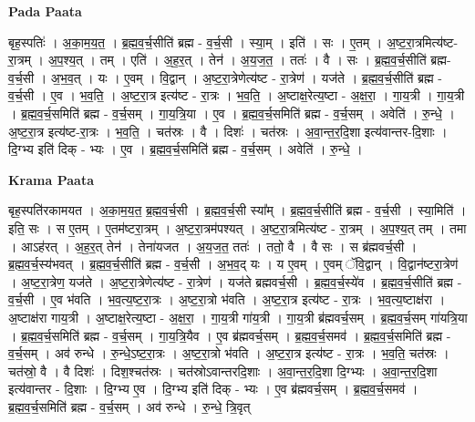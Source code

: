\documentclass[17pt]{extarticle}
\begin{document}
\textbf{Pada Paata} \newline

बृह॒स्पतिः॑ । अ॒का॒म॒य॒त॒ । ब्र॒ह्म॒व॒र्च॒सीति॑ ब्रह्म - व॒र्च॒सी । स्या॒म् । इति॑ । सः । ए॒तम् । अ॒ष्ट॒रा॒त्रमित्य॑ष्ट-रा॒त्रम् । अ॒प॒श्य॒त् । तम् । एति॑ । अ॒ह॒र॒त् । तेन॑ । अ॒य॒ज॒त॒ । ततः॑ । वै । सः । ब्र॒ह्म॒व॒र्च॒सीति॑ ब्रह्म-व॒र्च॒सी । अ॒भ॒व॒त् । यः । ए॒वम् । वि॒द्वान् । अ॒ष्ट॒रा॒त्रेणेत्य॑ष्ट - रा॒त्रेण॑ । यज॑ते । ब्र॒ह्म॒व॒र्च॒सीति॑ ब्रह्म - व॒र्च॒सी । ए॒व । भ॒व॒ति॒ । अ॒ष्ट॒रा॒त्र इत्य॑ष्ट - रा॒त्रः । भ॒व॒ति॒ । अ॒ष्टाक्ष॒रेत्य॒ष्टा - अ॒क्ष॒रा॒ । गा॒य॒त्री । गा॒य॒त्री । ब्र॒ह्म॒व॒र्च॒समिति॑ ब्रह्म - व॒र्च॒सम् । गा॒य॒त्रि॒या । ए॒व । ब्र॒ह्म॒व॒र्च॒समिति॑ ब्रह्म - व॒र्च॒सम् । अवेति॑ । रु॒न्धे॒ । अ॒ष्ट॒रा॒त्र इत्य॑ष्ट-रा॒त्रः । भ॒व॒ति॒ । चत॑स्रः । वै । दिशः॑ । चत॑स्रः । अ॒वा॒न्त॒र॒दि॒शा इत्य॑वान्तर-दि॒शाः । दि॒ग्भ्य इति॑ दिक् - भ्यः । ए॒व । ब्र॒ह्म॒व॒र्च॒समिति॑ ब्रह्म - व॒र्च॒सम् । अवेति॑ । रु॒न्धे॒ ।  \newline


\textbf{Krama Paata} \newline

बृह॒स्पति॑रकामयत । अ॒का॒म॒य॒त॒ ब्र॒ह्म॒व॒र्च॒सी । ब्र॒ह्म॒व॒र्च॒सी स्या᳚म् । ब्र॒ह्म॒व॒र्च॒सीति॑ ब्रह्म - व॒र्च॒सी । स्या॒मिति॑ । इति॒ सः । स ए॒तम् । ए॒तम॑ष्टरा॒त्रम् । अ॒ष्ट॒रा॒त्रम॑पश्यत् । अ॒ष्ट॒रा॒त्रमित्य॑ष्ट - रा॒त्रम् । अ॒प॒श्य॒त् तम् । तमा । आऽह॑रत् । अ॒ह॒र॒त् तेन॑ । तेना॑यजत । अ॒य॒ज॒त॒ ततः॑ । ततो॒ वै । वै सः । स ब्र॑ह्मवर्च॒सी । ब्र॒ह्म॒व॒र्च॒स्य॑भवत् । ब्र॒ह्म॒व॒र्च॒सीति॑ ब्रह्म - व॒र्च॒सी । अ॒भ॒व॒द् यः । य ए॒वम् । ए॒वम् ॅवि॒द्वान् । वि॒द्वान॑ष्टरा॒त्रेण॑ । अ॒ष्ट॒रा॒त्रेण॒ यज॑ते । अ॒ष्ट॒रा॒त्रेणेत्य॑ष्ट - रा॒त्रेण॑ । यज॑ते ब्रह्मवर्च॒सी । ब्र॒ह्म॒व॒र्च॒स्ये॑व । ब्र॒ह्म॒व॒र्च॒सीति॑ ब्रह्म - व॒र्च॒सी । ए॒व भ॑वति । भ॒व॒त्य॒ष्ट॒रा॒त्रः । अ॒ष्ट॒रा॒त्रो भ॑वति । अ॒ष्ट॒रा॒त्र इत्य॑ष्ट - रा॒त्रः । भ॒व॒त्य॒ष्टाक्ष॑रा । अ॒ष्टाक्ष॑रा गाय॒त्री । अ॒ष्टाक्ष॒रेत्य॒ष्टा - अ॒क्ष॒रा॒ । गा॒य॒त्री गा॑य॒त्री । गा॒य॒त्री ब्र॑ह्मवर्च॒सम् । ब्र॒ह्म॒व॒र्च॒सम् गा॑यत्रि॒या । ब्र॒ह्म॒व॒र्च॒समिति॑ ब्रह्म - व॒र्च॒सम् । गा॒य॒त्रि॒यैव । ए॒व ब्र॑ह्मवर्च॒सम् । ब्र॒ह्म॒व॒र्च॒समव॑ । ब्र॒ह्म॒व॒र्च॒समिति॑ ब्रह्म - व॒र्च॒सम् । अव॑ रुन्धे । रु॒न्धे॒ऽष्ट॒रा॒त्रः । अ॒ष्ट॒रा॒त्रो भ॑वति । अ॒ष्ट॒रा॒त्र इत्य॑ष्ट - रा॒त्रः । भ॒व॒ति॒ चत॑स्रः । चत॑स्रो॒ वै । वै दिशः॑ । दिश॒श्चत॑स्रः । चत॑स्रोऽवान्तरदि॒शाः । अ॒वा॒न्त॒र॒दि॒शा दि॒ग्भ्यः । अ॒वा॒न्त॒र॒दि॒शा इत्य॑वान्तर - दि॒शाः । दि॒ग्भ्य ए॒व । दि॒ग्भ्य इति॑ दिक् - भ्यः । ए॒व ब्र॑ह्मवर्च॒सम् । ब्र॒ह्म॒व॒र्च॒समव॑ । ब्र॒ह्म॒व॒र्च॒समिति॑ ब्रह्म - व॒र्च॒सम् । अव॑ रुन्धे । रु॒न्धे॒ त्रि॒वृत् \newline
\end{document}
